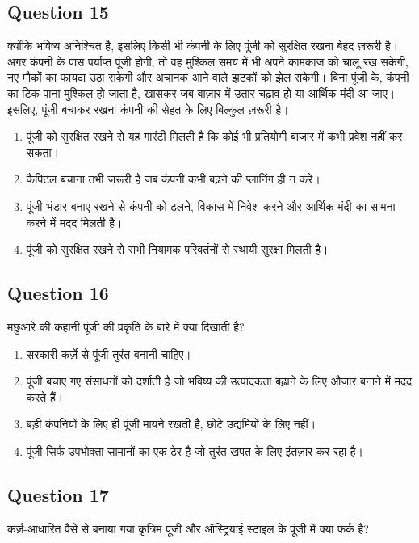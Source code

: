 \documentclass[12pt,a4paper]{article}
\begin{document}
\bigskip


\subsection*{Question 15}
क्योंकि भविष्य अनिश्चित है, इसलिए किसी भी कंपनी के लिए पूंजी को सुरक्षित रखना बेहद ज़रूरी है। अगर कंपनी के पास पर्याप्त पूंजी होगी, तो वह मुश्किल समय में भी अपने कामकाज को चालू रख सकेगी, नए मौकों का फायदा उठा सकेगी और अचानक आने वाले झटकों को झेल सकेगी। बिना पूंजी के, कंपनी का टिक पाना मुश्किल हो जाता है, खासकर जब बाज़ार में उतार-चढ़ाव हो या आर्थिक मंदी आ जाए। इसलिए, पूंजी बचाकर रखना कंपनी की सेहत के लिए बिल्कुल ज़रूरी है।

\begin{enumerate}[label=\Alph*., leftmargin=*]
\item पूंजी को सुरक्षित रखने से यह गारंटी मिलती है कि कोई भी प्रतियोगी बाजार में कभी प्रवेश नहीं कर सकता।
\item कैपिटल बचाना तभी जरूरी है जब कंपनी कभी बढ़ने की प्लानिंग ही न करे।
\item पूंजी भंडार बनाए रखने से कंपनी को ढलने, विकास में निवेश करने और आर्थिक मंदी का सामना करने में मदद मिलती है।
\item पूंजी को सुरक्षित रखने से सभी नियामक परिवर्तनों से स्थायी सुरक्षा मिलती है।
\end{enumerate}

\bigskip


\subsection*{Question 16}
मछुआरे की कहानी पूंजी की प्रकृति के बारे में क्या दिखाती है?

\begin{enumerate}[label=\Alph*., leftmargin=*]
\item सरकारी कर्ज़े से पूंजी तुरंत बनानी चाहिए।
\item पूंजी बचाए गए संसाधनों को दर्शाती है जो भविष्य की उत्पादकता बढ़ाने के लिए औजार बनाने में मदद करते हैं।
\item बड़ी कंपनियों के लिए ही पूंजी मायने रखती है, छोटे उद्यमियों के लिए नहीं।
\item पूंजी सिर्फ उपभोक्ता सामानों का एक ढेर है जो तुरंत खपत के लिए इंतज़ार कर रहा है।
\end{enumerate}

\bigskip


\subsection*{Question 17}
कर्ज़-आधारित पैसे से बनाया गया कृत्रिम पूंजी और ऑस्ट्रियाई स्टाइल के पूंजी में क्या फर्क है?
\end{document}
